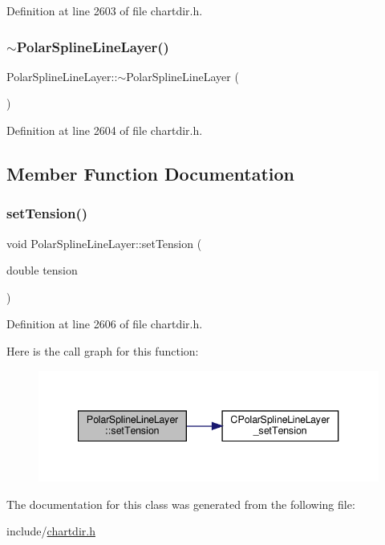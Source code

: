 Definition at line 2603 of file chartdir.\+h.

\mbox{\label{class_polar_spline_line_layer_a63ad952368bfaede06c620991ad3666c}} 
\subsubsection{\texorpdfstring{$\sim$\+Polar\+Spline\+Line\+Layer()}{~PolarSplineLineLayer()}}
{\footnotesize\ttfamily Polar\+Spline\+Line\+Layer\+::$\sim$\+Polar\+Spline\+Line\+Layer (\begin{DoxyParamCaption}{ }\end{DoxyParamCaption})\hspace{0.3cm}{\ttfamily [inline]}}



Definition at line 2604 of file chartdir.\+h.



\subsection{Member Function Documentation}
\mbox{\label{class_polar_spline_line_layer_a61d176212357ddf5126b1f8a69dabdf5}} 
\subsubsection{\texorpdfstring{set\+Tension()}{setTension()}}
{\footnotesize\ttfamily void Polar\+Spline\+Line\+Layer\+::set\+Tension (\begin{DoxyParamCaption}\item[{double}]{tension }\end{DoxyParamCaption})\hspace{0.3cm}{\ttfamily [inline]}}



Definition at line 2606 of file chartdir.\+h.

Here is the call graph for this function\+:
\nopagebreak
\begin{figure}[H]
\begin{center}
\leavevmode
\includegraphics[width=340pt]{class_polar_spline_line_layer_a61d176212357ddf5126b1f8a69dabdf5_cgraph}
\end{center}
\end{figure}


The documentation for this class was generated from the following file\+:\begin{DoxyCompactItemize}
\item 
include/\hyperlink{chartdir_8h}{chartdir.\+h}\end{DoxyCompactItemize}
